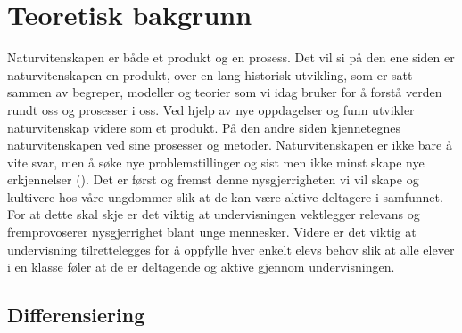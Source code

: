 \documentclass[main.tex]{subfiles}
\begin{document}
\section*{Teoretisk bakgrunn}

Naturvitenskapen er både et produkt og en prosess. Det vil si på den ene siden er naturvitenskapen en produkt, over en lang historisk utvikling, som er satt sammen av begreper, modeller og teorier som vi idag bruker for å forstå verden rundt oss og prosesser i oss. Ved hjelp av nye oppdagelser og funn utvikler naturvitenskap videre som et produkt. På den andre siden kjennetegnes naturvitenskapen ved sine prosesser og metoder. Naturvitenskapen er ikke bare å vite svar, men å søke nye problemstillinger og sist men ikke minst skape nye erkjennelser  (). Det er først og fremst denne nysgjerrigheten vi vil skape og kultivere hos våre ungdommer slik at de kan være aktive deltagere i samfunnet. For at dette skal skje er det viktig at undervisningen vektlegger relevans og fremprovoserer nysgjerrighet blant unge mennesker. Videre er det viktig at undervisning tilrettelegges for å oppfylle hver enkelt elevs behov slik at alle elever i en klasse føler at de er deltagende og aktive gjennom undervisningen.

\subsection*{Differensiering}
\end{document}
